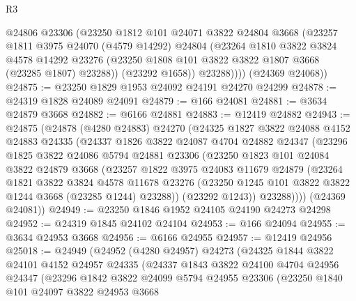 \begin{lexlean}{R3}
\begin{coremodule}
            @24806
            @23306
            (@23250
              @1812
              @101
              @24071
              @3822
              @24804
              @3668
              (@23257
                @1811
                @3975
                @24070
                (@4579 @14292)
                @24804
                (@23264
                  @1810
                  @3822
                  @3824
                  @4578
                  @14292
                  @23276
                  (@23250 @1808 @101 @3822 @3822 @1807 @3668 (@23285 @1807) @23288))
                (@23292 @1658))
              @23288))))
      (@24369 @24068))
@24875 := @23250 @1829 @1953 @24092 @24191 @24270 @24299
@24878 := @24319 @1828 @24089 @24091
@24879 := @166 @24081
@24881 := @3634 @24879 @3668
@24882 := @6166 @24881
@24883 := @12419 @24882
@24943 := @24875
    (@24878
      (@4280 @24883)
      @24270
      (@24325
        @1827
        @3822
        @24088
        @4152
        @24883
        @24335
        (@24337
          @1826
          @3822
          @24087
          @4704
          @24882
          @24347
          (@23296
            @1825
            @3822
            @24086
            @5794
            @24881
            @23306
            (@23250
              @1823
              @101
              @24084
              @3822
              @24879
              @3668
              (@23257
                @1822
                @3975
                @24083
                @11679
                @24879
                (@23264
                  @1821
                  @3822
                  @3824
                  @4578
                  @11678
                  @23276
                  (@23250 @1245 @101 @3822 @3822 @1244 @3668 (@23285 @1244) @23288))
                (@23292 @1243))
              @23288))))
      (@24369 @24081))
@24949 := @23250 @1846 @1952 @24105 @24190 @24273 @24298
@24952 := @24319 @1845 @24102 @24104
@24953 := @166 @24094
@24955 := @3634 @24953 @3668
@24956 := @6166 @24955
@24957 := @12419 @24956
@25018 := @24949
    (@24952
      (@4280 @24957)
      @24273
      (@24325
        @1844
        @3822
        @24101
        @4152
        @24957
        @24335
        (@24337
          @1843
          @3822
          @24100
          @4704
          @24956
          @24347
          (@23296
            @1842
            @3822
            @24099
            @5794
            @24955
            @23306
            (@23250
              @1840
              @101
              @24097
              @3822
              @24953
              @3668

\end{coremodule}
\end{lexlean}
